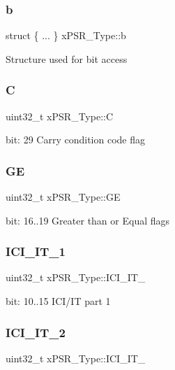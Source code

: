 \subsubsection{\texorpdfstring{b}{b}\hspace{0.1cm}{\footnotesize\ttfamily [12/12]}}
{\footnotesize\ttfamily struct \{ ... \}   x\+P\+S\+R\+\_\+\+Type\+::b}

Structure used for bit access \mbox{\label{unionx_p_s_r___type_a40213a6b5620410cac83b0d89564609d}} 
\subsubsection{\texorpdfstring{C}{C}}
{\footnotesize\ttfamily uint32\+\_\+t x\+P\+S\+R\+\_\+\+Type\+::C}

bit\+: 29 Carry condition code flag \mbox{\label{unionx_p_s_r___type_a2d0ec4ccae337c1df5658f8cf4632e76}} 
\subsubsection{\texorpdfstring{GE}{GE}}
{\footnotesize\ttfamily uint32\+\_\+t x\+P\+S\+R\+\_\+\+Type\+::\+GE}

bit\+: 16..19 Greater than or Equal flags \mbox{\label{unionx_p_s_r___type_aa57a08ddc8ac3ee066e88dfddc3aa72a}} 
\subsubsection{\texorpdfstring{ICI\_IT\_1}{ICI\_IT\_1}}
{\footnotesize\ttfamily uint32\+\_\+t x\+P\+S\+R\+\_\+\+Type\+::\+I\+C\+I\+\_\+\+I\+T\+\_}

bit\+: 10..15 I\+C\+I/\+IT part 1 \mbox{\label{unionx_p_s_r___type_adf3639bb7c6e54e5712f2ddef46a702e}} 
\subsubsection{\texorpdfstring{ICI\_IT\_2}{ICI\_IT\_2}}
{\footnotesize\ttfamily uint32\+\_\+t x\+P\+S\+R\+\_\+\+Type\+::\+I\+C\+I\+\_\+\+I\+T\+\_}

